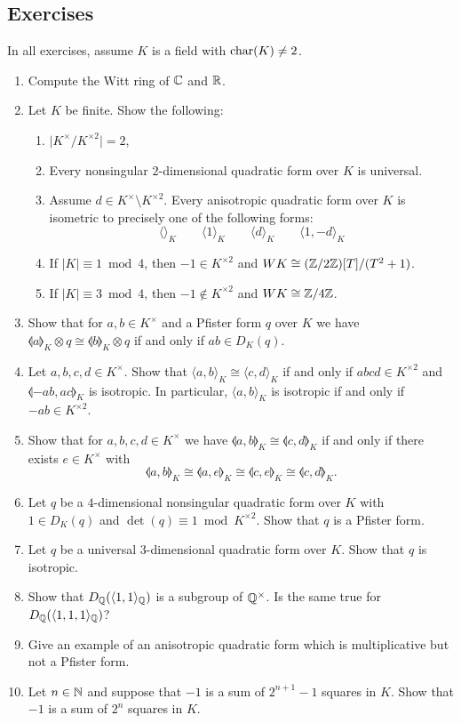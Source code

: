 \documentclass[12pt, leqno, british]{amsart}
\begin{document}
\subsection{Exercises}\label{Exercises-L4}
In all exercises, assume $K$ is a field with $\operatorname{char}(K) \neq 2$.
\begin{enumerate}
\item Compute the Witt ring of $\mathbb C$ and $\mathbb R$.
\item\label{it:finite-field-Witt} Let $K$ be finite.
Show the following:
\begin{enumerate}
\item $\lvert K^\times / K^{\times 2} \rvert = 2$,
\item Every nonsingular $2$-dimensional quadratic form over $K$ is universal.
\item Assume $d \in K^\times \setminus K^{\times 2}$.
Every anisotropic quadratic form over $K$ is isometric to precisely one of the following forms:
\begin{displaymath}
\langle \rangle_K \qquad \langle 1 \rangle_K \qquad \langle d \rangle_K \qquad \langle 1, -d \rangle_K
\end{displaymath}
\item If $\lvert K \rvert \equiv 1 \bmod 4$, then $-1 \in K^{\times 2}$ and $WK \cong (\mathbb Z/2\mathbb Z)[T]/(T^2 + 1)$.
\item If $\lvert K \rvert \equiv 3 \bmod 4$, then $-1 \not\in K^{\times 2}$ and $WK \cong \mathbb Z/4\mathbb Z$.
\end{enumerate}
\item
Show that for $a, b \in K^\times$ and a Pfister form $q$ over $K$ we have $\llangle a \rrangle_K \otimes q \cong \llangle b \rrangle_K \otimes q$ if and only if $ab \in D_K(q)$.
\item\label{ex:2-dim-form-isometric} Let $a, b, c, d \in K^\times$.
Show that $\langle a, b \rangle_K \cong \langle c, d \rangle_K$ if and only if $abcd \in K^{\times 2}$ and $\llangle -ab, ac \rrangle_K$ is isotropic.
In particular, $\langle a, b \rangle_K$ is isotropic if and only if $-ab \in K^{\times 2}$.
\item Show that for $a, b, c, d \in K^\times$ we have $\llangle a, b \rrangle_K \cong \llangle c, d \rrangle_K$ if and only if there exists $e \in K^\times$ with
$$ \llangle a, b \rrangle_K \cong \llangle a, e \rrangle_K \cong \llangle c, e \rrangle_K \cong \llangle c, d \rrangle_K.$$
\item\label{ex:4-dim-Pfister} Let $q$ be a $4$-dimensional nonsingular quadratic form over $K$ with $1 \in D_K(q)$ and $\det(q) \equiv 1 \bmod K^{\times 2}$.
Show that $q$ is a Pfister form.
\item Let $q$ be a universal $3$-dimensional quadratic form over $K$.
Show that $q$ is isotropic.
\item Show that $D_\mathbb Q(\langle 1, 1 \rangle_\mathbb Q)$ is a subgroup of $\mathbb Q^\times$.
Is the same true for $D_\mathbb Q(\langle 1, 1, 1 \rangle_\mathbb Q)$?
\item Give an example of an anisotropic quadratic form which is multiplicative but not a Pfister form.
\item Let $n \in \mathbb N$ and suppose that $-1$ is a sum of $2^{n+1} - 1$ squares in $K$.
Show that $-1$ is a sum of $2^n$ squares in $K$.
\end{enumerate}
\end{document}

